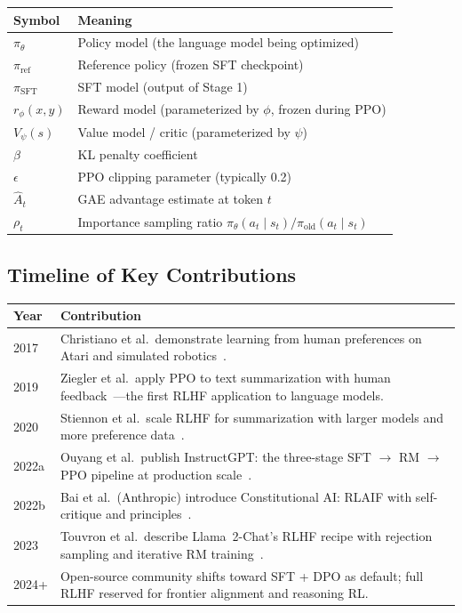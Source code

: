 \begin{center}
\begin{tabular}{ll}
\toprule
Symbol & Meaning \\
\midrule
$\pi_\theta$ & Policy model (the language model being optimized) \\
$\pi_{\text{ref}}$ & Reference policy (frozen SFT checkpoint) \\
$\pi_{\text{SFT}}$ & SFT model (output of Stage 1) \\
$r_\phi(x, y)$ & Reward model (parameterized by $\phi$, frozen during PPO) \\
$V_\psi(s)$ & Value model / critic (parameterized by $\psi$) \\
$\beta$ & KL penalty coefficient \\
$\epsilon$ & PPO clipping parameter (typically 0.2) \\
$\hat{A}_t$ & GAE advantage estimate at token $t$ \\
$\rho_t$ & Importance sampling ratio $\pi_\theta(a_t \mid s_t) / \pi_{\text{old}}(a_t \mid s_t)$ \\
\bottomrule
\end{tabular}
\end{center}


\subsection*{Timeline of Key Contributions}

\begin{center}
\begin{tabular}{lp{11cm}}
\toprule
Year & Contribution \\
\midrule
2017 & Christiano et al.\ demonstrate learning from human preferences on Atari and simulated robotics~\cite{christiano2017deep}. \\
2019 & Ziegler et al.\ apply PPO to text summarization with human feedback~\cite{ziegler2019finetuning}---the first RLHF application to language models. \\
2020 & Stiennon et al.\ scale RLHF for summarization with larger models and more preference data~\cite{stiennon2020summarize}. \\
2022a & Ouyang et al.\ publish InstructGPT: the three-stage SFT $\to$ RM $\to$ PPO pipeline at production scale~\cite{ouyang2022instructgpt}. \\
2022b & Bai et al.\ (Anthropic) introduce Constitutional AI: RLAIF with self-critique and principles~\cite{bai2022constitutional}. \\
2023 & Touvron et al.\ describe Llama~2-Chat's RLHF recipe with rejection sampling and iterative RM training~\cite{touvron2023llama2}. \\
2024+ & Open-source community shifts toward SFT + DPO as default; full RLHF reserved for frontier alignment and reasoning RL. \\
\bottomrule
\end{tabular}
\end{center}


